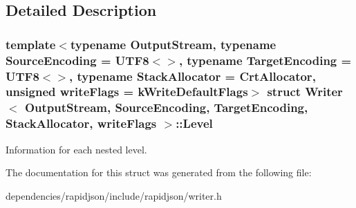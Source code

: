 \subsection{Detailed Description}
\subsubsection*{template$<$typename Output\+Stream, typename Source\+Encoding = U\+T\+F8$<$$>$, typename Target\+Encoding = U\+T\+F8$<$$>$, typename Stack\+Allocator = Crt\+Allocator, unsigned write\+Flags = k\+Write\+Default\+Flags$>$\newline
struct Writer$<$ Output\+Stream, Source\+Encoding, Target\+Encoding, Stack\+Allocator, write\+Flags $>$\+::\+Level}

Information for each nested level. 

The documentation for this struct was generated from the following file\+:\begin{DoxyCompactItemize}
\item 
dependencies/rapidjson/include/rapidjson/writer.\+h\end{DoxyCompactItemize}
